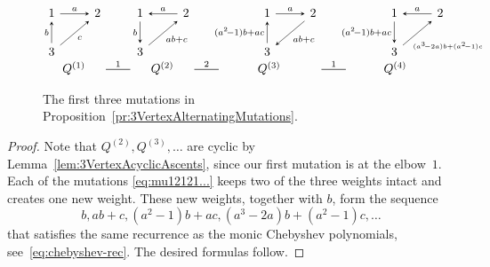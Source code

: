 \documentclass[11pt, letterpaper]{amsart}
\theoremstyle{definition}
\numberwithin{equation}{section}
\newcommand{\mutation}[1]{\stackrel{#1}{\rule[.5ex]{2em}{0.5pt}}}
\begin{document}
\begin{figure}[ht]
\begin{equation*}
\!\!\!\!\begin{array}{ccccccc}
\begin{tikzcd}[arrows={-stealth}]
  1 \arrow[r, "a"]  
  & 2 
  \\
  3 \arrow[u,"b"] \arrow[ur, swap, "c" ] &
\end{tikzcd}
& &
\begin{tikzcd}[arrows={-stealth}]
  1    \arrow[d, swap, "b"] 
  & 2 \arrow[l, swap, "a" ]  
  \\
   3 \arrow[ur, swap, "ab+c"] &
\end{tikzcd}
& &
\!\begin{tikzcd}[arrows={-stealth}]
  1    \arrow[r, "a"]
  & 2  \arrow[dl, "ab+c" ] 
  \\
   3 \arrow[u, "\!\!\!(a^2\!-1)b+ac"] &
\end{tikzcd}
& &
\!\begin{tikzcd}[arrows={-stealth}]
  1    \arrow[d, swap, "\!\!\!(a^2\!-1)b+ac"] 
  & 2 \arrow[l, swap, "a" ]  
  \\
   3 \arrow[ur, swap, "\scriptscriptstyle{(a^3\!-2a)b+(a^2\!-1)c}", near start]& %
\end{tikzcd}
\\
Q^{(1)}
& \!\!\!\!\!\!\mutation{1}\!\!\!\!\!\!
& Q^{(2)}
& \!\!\!\!\!\!\mutation{2}\!\!\!\!\!\!
& \!Q^{(3)}
& \!\!\!\!\!\!\!\!\mutation{1}\!\!\!\!\!\!\!\!
& \!\!\!\!\!\!\!\!\!\!\!\!\!\!\!\!\!\!\!\!Q^{(4)}
\end{array}
\!
\end{equation*}
\caption{The first three mutations in Proposition~\ref{pr:3VertexAlternatingMutations}.}
\label{fig:mu1mu2}
\end{figure}

\begin{proof} 
Note that $Q^{(2)}, Q^{(3)}, \ldots$ are cyclic by Lemma~\ref{lem:3VertexAcyclicAscents}, since our first mutation is at the elbow~$1.$ 
Each of the mutations \eqref{eq:mu12121...} keeps two of the three weights intact and creates one new weight.
These new weights, together with $b$, form the sequence
\begin{equation*}
b, ab+c, (a^2-1)b+ac, (a^3-2a)b+(a^2-1)c, \dots 
\end{equation*}
that satisfies the same recurrence as the monic Chebyshev polynomials, see~\eqref{eq:chebyshev-rec}.
The desired formulas follow.
\end{proof}
\end{document}
